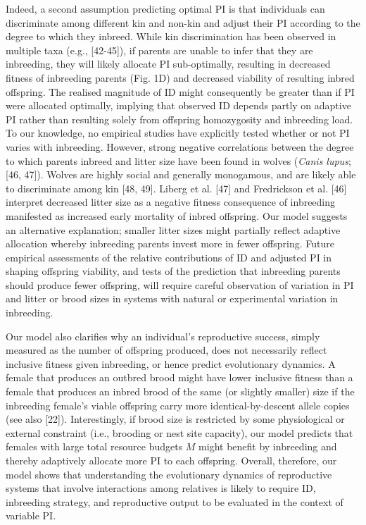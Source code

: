\documentclass[12pt]{article}
\begin{document}
Indeed, a second assumption predicting optimal PI is that individuals can discriminate among different kin and non-kin and adjust their PI according to the degree to which they inbreed. While kin discrimination has been observed in multiple taxa (e.g., [42-45]), if parents are unable to infer that they are inbreeding, they will likely allocate PI sub-optimally, resulting in decreased fitness of inbreeding parents (Fig. 1D) and decreased viability of resulting inbred offspring. The realised magnitude of ID might consequently be greater than if PI were allocated optimally, implying that observed ID depends partly on adaptive PI rather than resulting solely from offspring homozygosity and inbreeding load. To our knowledge, no empirical studies have explicitly tested whether or not PI varies with inbreeding. However, strong negative correlations between the degree to which parents inbreed and litter size have been found in wolves (\textit{Canis lupus}; [46, 47]). Wolves are highly social and generally monogamous, and are likely able to discriminate among kin [48, 49]. Liberg et al. [47] and Fredrickson et al. [46] interpret decreased litter size as a negative fitness consequence of inbreeding manifested as increased early mortality of inbred offspring. Our model suggests an alternative explanation; smaller litter sizes might partially reflect adaptive allocation whereby inbreeding parents invest more in fewer offspring. Future empirical assessments of the relative contributions of ID and adjusted PI in shaping offspring viability, and tests of the prediction that inbreeding parents should produce fewer offspring, will require careful observation of variation in PI and litter or brood sizes in systems with natural or experimental variation in inbreeding.

Our model also clarifies why an individual's reproductive success, simply measured as the number of offspring produced, does not necessarily reflect inclusive fitness given inbreeding, or hence predict evolutionary dynamics. A female that produces an outbred brood might have lower inclusive fitness than a female that produces an inbred brood of the same (or slightly smaller) size if the inbreeding female's viable offspring carry more identical-by-descent allele copies (see also [22]). Interestingly, if brood size is restricted by some physiological or external constraint (i.e., brooding or nest site capacity), our model predicts that females with large total resource budgets $M$ might benefit by inbreeding and thereby adaptively allocate more PI to each offspring. Overall, therefore, our model shows that understanding the evolutionary dynamics of reproductive systems that involve interactions among relatives is likely to require ID, inbreeding strategy, and reproductive output to be evaluated in the context of variable PI.
\end{document}
